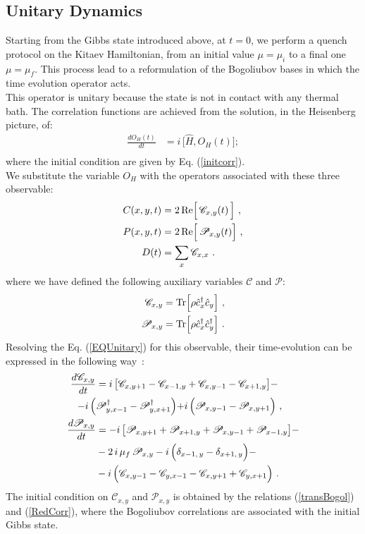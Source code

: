 \documentclass[pra,twocolumn,preprintnumbers,amsmath,amssymb,nofootinbib,floatfix,longbibliography]{revtex4}
\begin{document}
\subsection{Unitary Dynamics}

Starting from the Gibbs state introduced above, at $t=0$,
we perform a quench protocol on the Kitaev Hamiltonian,
from an initial value $\mu = \mu_i$ to a final one $\mu =
\mu_f$. This process lead to a reformulation of the
Bogoliubov bases in which the time evolution operator
acts.\\This operator is unitary because the state is not in
contact with any thermal bath. The correlation functions
are achieved from the solution, in the Heisenberg picture,
of:
\begin{align}
   \label{EQUnitary}
   \frac{d O_{H}(t) }{d t}  &= i\,\Bigr[\hat H,
      O_{H}(t) \Bigr] ;\\
\end{align}
where the initial condition are given by Eq.
(\ref{initcorr}).\\
We substitute the variable $O_{H}$ with the operators
associated with these three observable:
\begin{align}
C(x,y,t) & =  2\,{\rm Re}\Bigr[
\,{\mathscr{C}_{x,y}}(t) \,\Bigr]        \,\,, \\
P(x,y,t) & = 2\,{\rm Re}\Bigr[
\,{\mathscr{P}_{x,y}}(t) \Bigr]   \,\,,\\
D(t) & = \sum_x \mathscr{C}_{x,x} \,\,.
\end{align}
where we have defined the following auxiliary
variables $\mathscr{C}$ and $\mathscr{P}$:
\begin{align}
  \label{RedCorr}
  \mathscr{C}_{x,y} &= {\rm Tr}\Bigr[\rho \hat c^\dagger_x
    \hat c_y\Bigr]\,\,,\\
  \mathscr{P}_{x,y} &= {\rm Tr}\Bigr[\rho \hat c^\dagger_x
    \hat c^\dagger_y\Bigr]\,\,.
\end{align}
Resolving the Eq. (\ref{EQUnitary}) for this observable,
their time-evolution can be expressed in the following
way~\cite{TV21}:
\begin{align}
\frac{d\mathscr{C}_{x,y}}{dt}& =
i\,\bigr[\mathscr{C}_{x,y+1} - \mathscr{C}_{x-1,y} +
\mathscr{C}_{x,y-1} - \mathscr{C}_{x+1,y} \bigr] - \notag\\
-i\, \Bigl(& \mathscr{P}_{y,x-1}^\dagger -
\mathscr{P}_{y,x+1}^\dagger \Bigl)  + i\, \Bigl(
\mathscr{P}_{x,y-1} - \mathscr{P}_{x,y+1} \Bigl) \,\,, \\
\frac{d\mathscr{P}_{x,y}}{dt} &=
-i\,\bigr[\mathscr{P}_{x,y+1} + \mathscr{P}_{x+1,y}+
\mathscr{P}_{x,y-1} + \mathscr{P}_{x-1,y} \bigr] - \notag\\
&- 2\,i\,\mu_f  \,\mathscr{P}_{x,y}-i\,\Bigl(
\delta _{x-1,\,y} - \delta _{x+1,\,y} \Bigl) - \notag \\
 &- i\, \Bigl( \mathscr{C}_{x,y-1} -
\mathscr{C}_{y,x-1} - \mathscr{C}_{x,y+1}
+ \mathscr{C}_{y,x+1} \Bigl) \,\,.
\end{align}
The initial condition on $\mathscr{C}_{x,y}$ and
$\mathscr{P}_{x,y}$ is obtained by the relations
(\ref{transBogol}) and (\ref{RedCorr}), where the
Bogoliubov correlations are associated with the initial
Gibbs state.
\end{document}
